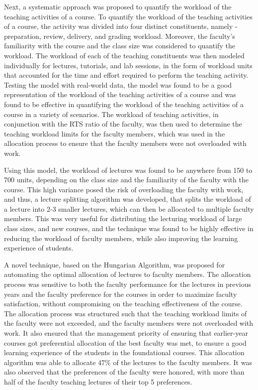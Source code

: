 Next, a systematic approach was proposed to quantify the workload of the teaching activities of a course. To quantify the workload of the teaching activities of a course, the activity was divided into four distinct constituents, namely - preparation, review, delivery, and grading workload. Moreover, the faculty's familiarity with the course and the class size was considered to quantify the workload. The workload of each of the teaching constituents was then modeled individually for lectures, tutorials, and lab sessions, in the form of workload units that accounted for the time and effort required to perform the teaching activity. Testing the model with real-world data, the model was found to be a good representation of the workload of the teaching activities of a course and was found to be effective in quantifying the workload of the teaching activities of a course in a variety of scenarios. The workload of teaching activities, in conjunction with the RTS ratio of the faculty, was then used to determine the teaching workload limits for the faculty members, which was used in the allocation process to ensure that the faculty members were not overloaded with work.

Using this model, the workload of lectures was found to be anywhere from 150 to 700 units, depending on the class size and the familiarity of the faculty with the course. This high variance posed the risk of overloading the faculty with work, and thus, a lecture splitting algorithm was developed, that splits the workload of a lecture into 2-3 smaller lectures, which can then be allocated to multiple faculty members. This was very useful for distributing the lecturing workload of large class sizes, and new courses, and the technique was found to be highly effective in reducing the workload of faculty members, while also improving the learning experience of students.

A novel technique, based on the Hungarian Algorithm, was proposed for automating the optimal allocation of lectures to faculty members. The allocation process was sensitive to both the faculty performance for the lectures in previous years and the faculty preference for the courses in order to maximize faculty satisfaction, without compromising on the teaching effectiveness of the course. The allocation process was structured such that the teaching workload limits of the faculty were not exceeded, and the faculty members were not overloaded with work. It also ensured that the management priority of ensuring that earlier-year courses got preferential allocation of the best faculty was met, to ensure a good learning experience of the students in the foundational courses. This allocation algorithm was able to allocate 47\% of the lectures to the faculty members. It was also observed that the preferences of the faculty were honored, with more than half of the faculty teaching lectures of their top 5 preferences.

